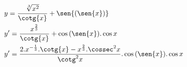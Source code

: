 \begin{ex}
\begin{align}
&y=\frac{\sqrt[3]{x^2}}{\cotg{x}}+\sen{(\sen{x})}\nonumber\\
&y'=\frac{x^\frac{2}{3}}{\cotg{x}}+\cos{(\sen{x})}.\cos{x}\nonumber\\
&y'=\frac{2.x^{-\frac{1}{3}}.\cotg{x}-x^{\frac{2}{3}}.\cossec^2{x}}{\cotg^2{x}}.\cos{(\sen{x})}.\cos{x}\nonumber
\end{align}
\end{ex}